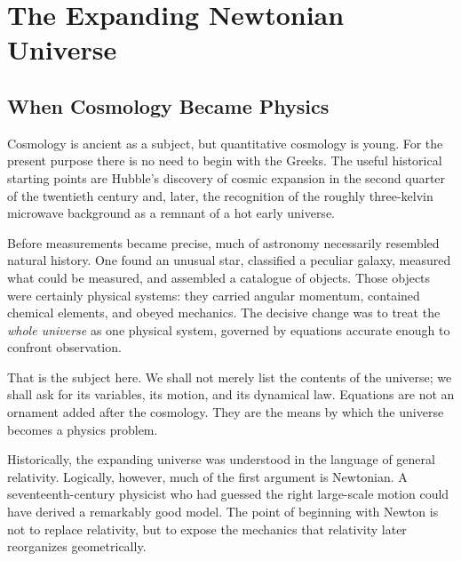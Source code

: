\chapter{The Expanding Newtonian Universe}


\section{When Cosmology Became Physics}

Cosmology is ancient as a subject, but quantitative cosmology is young. For the present purpose there is no need to begin with the Greeks. The useful historical starting points are Hubble's discovery of cosmic expansion in the second quarter of the twentieth century and, later, the recognition of the roughly three-kelvin microwave background as a remnant of a hot early universe.

Before measurements became precise, much of astronomy necessarily resembled natural history. One found an unusual star, classified a peculiar galaxy, measured what could be measured, and assembled a catalogue of objects. Those objects were certainly physical systems: they carried angular momentum, contained chemical elements, and obeyed mechanics. The decisive change was to treat the \emph{whole universe} as one physical system, governed by equations accurate enough to confront observation.

That is the subject here. We shall not merely list the contents of the universe; we shall ask for its variables, its motion, and its dynamical law. Equations are not an ornament added after the cosmology. They are the means by which the universe becomes a physics problem.

Historically, the expanding universe was understood in the language of general relativity. Logically, however, much of the first argument is Newtonian. A seventeenth-century physicist who had guessed the right large-scale motion could have derived a remarkably good model. The point of beginning with Newton is not to replace relativity, but to expose the mechanics that relativity later reorganizes geometrically.

